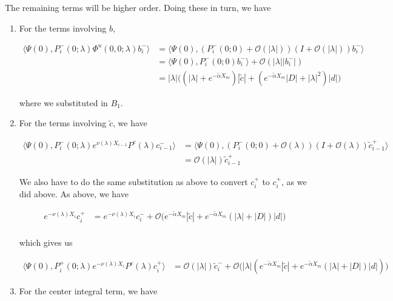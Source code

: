 \documentclass[12pt]{article}
\begin{document}
The remaining terms will be higher order. Doing these in turn, we have

\begin{enumerate}
\item For the terms involving $b$,

\begin{align*}
\langle \Psi(0), P_i^-(0; \lambda) \Phi^u(0, 0; \lambda) b_i^- \rangle
&= \langle \Psi(0), (P_i^-(0; 0) + \mathcal{O}(|\lambda|))(I + \mathcal{O}(|\lambda|)) b_i^- \rangle \\
&= \langle \Psi(0), P_i^-(0; 0) b_i^- \rangle + \mathcal{O}(|\lambda||b_i^-|) \\
&= |\lambda| \Big(
(|\lambda| + e^{-\tilde{\alpha}X_m})|\tilde{c}|
+ (e^{-\tilde{\alpha}X_m}|D| 
+ |\lambda|^2)|d|
\Big)
\end{align*}

where we substituted in $B_1$.

\item For the terms involving $\tilde{c}$, we have

\begin{align*}
\langle \Psi(0), P_i^-(0; \lambda)e^{\nu(\lambda) X_{i-1}} P^c(\lambda) c_{i-1}^-\rangle &= 
\langle \Psi(0), (P_i^-(0; 0) + \mathcal{O}(\lambda))(I + \mathcal{O}(\lambda)) \tilde{c}_{i-1}^+ \rangle \\
&= \mathcal{O}(|\lambda|) \tilde{c}_{i-1}^+
\end{align*}

We also have to do the same substitution as above to convert $c_i^+$ to $c_i^+$, as we did above. As above, we have

\begin{align*}
e^{-\nu(\lambda)X_i} c_i^+ &= e^{-\nu(\lambda)X_i} c_i^- + \mathcal{O}\Big( e^{-\tilde{\alpha} X_m} |\tilde{c}| + e^{-\tilde{\alpha} X_m}(|\lambda| + |D| ) |d| \Big) \\
\end{align*}

which gives us

\begin{align*}
\langle \Psi(0), P_i^+(0; \lambda)e^{-\nu(\lambda) X_i} P^c(\lambda) c_i^+ \rangle 
&= \mathcal{O}(|\lambda|) \tilde{c}_i^- + \mathcal{O}\Big( |\lambda|( e^{-\tilde{\alpha} X_m} |\tilde{c}| + e^{-\tilde{\alpha} X_m}(|\lambda| + |D| ) |d| ) \Big)
\end{align*}

\item For the center integral term, we have


\end{enumerate}
\end{document}
